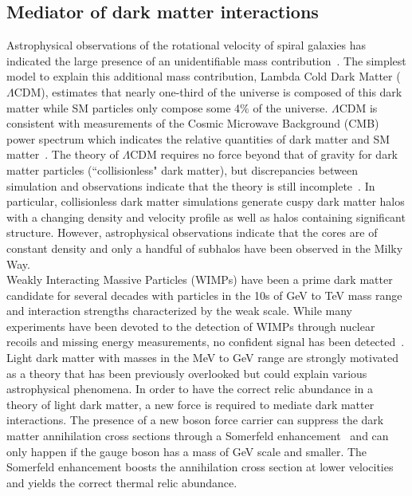 \subsection{Mediator of dark matter interactions}

Astrophysical observations of the rotational velocity of spiral galaxies has indicated the large presence of an unidentifiable mass contribution~\cite{Sofue:2000jx}. The simplest model to explain this additional mass contribution, Lambda Cold Dark Matter ($\Lambda$CDM), estimates that nearly one-third of the universe is composed of this dark matter while SM particles only compose some 4$\%$ of the universe. $\Lambda$CDM is consistent with measurements of the Cosmic Microwave Background (CMB) power spectrum which indicates the relative quantities of dark matter and SM matter~\cite{madhavacheril_current_2014}. The theory of $\Lambda$CDM requires no force beyond that of gravity for dark matter particles (``collisionless" dark matter), but discrepancies between simulation and observations indicate that the theory is still incomplete~\cite{weinberg_cold_2013}. In particular, collisionless dark matter simulations generate cuspy dark matter halos with a changing density and velocity profile as well as halos containing significant structure. However, astrophysical observations indicate that the cores are of constant density and only a handful of subhalos have been observed in the Milky Way.  \\
\indent Weakly Interacting Massive Particles (WIMPs) have been a prime dark matter candidate for several decades with particles in the 10s of GeV to TeV mass range and interaction strengths characterized by the weak scale. While many experiments have been devoted to the detection of WIMPs through nuclear recoils and missing energy measurements, no confident signal has been detected~\cite{liu_signals_2015}. Light dark matter with masses in the MeV to GeV range are strongly motivated as a theory that has been previously overlooked but could explain various astrophysical phenomena. In order to have the correct relic abundance in a theory of light dark matter, a new force is required to mediate dark matter interactions. The presence of a new boson force carrier can suppress the dark matter annihilation cross sections through a Somerfeld enhancement~\cite{arkani-hamed_theory_2009} and can only happen if the gauge boson has a mass of GeV scale and smaller. The Somerfeld enhancement boosts the annihilation cross section at lower velocities and yields the correct thermal relic abundance. \\

